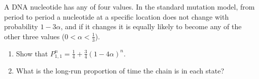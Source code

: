 \setcounter{exercise}{20}
\begin{exercise}
\label{ex:markov-chains-21}
A DNA nucleotide has any of four values.  In the standard mutation model,
from period to period a nucleotide at a specific location does not change
with probability $1-3\alpha$, and if it changes it is equally likely to
become any of the other three values ($0<\alpha<\tfrac{1}{3}$).
\begin{enumerate}
\item[(a)] Show that $P^n_{1,1}=\tfrac{1}{4}+\tfrac{3}{4}(1-4\alpha)^n$.
\item[(b)] What is the long-run proportion of time the chain is in each state?
\end{enumerate}
\end{exercise}

